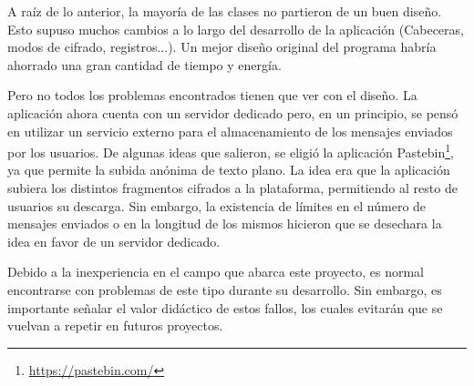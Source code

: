 A raíz de lo anterior, la mayoría de las clases no partieron de un buen diseño. Esto supuso muchos cambios a lo largo del desarrollo de la aplicación (Cabeceras, modos de cifrado, registros...). Un mejor diseño original del programa habría ahorrado una gran cantidad de tiempo y energía.

Pero no todos los problemas encontrados tienen que ver con el diseño. La aplicación ahora cuenta con un servidor dedicado pero, en un principio, se pensó en utilizar un servicio externo para el almacenamiento de los mensajes enviados por los usuarios. De algunas ideas que salieron, se eligió la aplicación Pastebin\footnote{\url{https://pastebin.com/}}, ya que permite la subida anónima de texto plano. La idea era que la aplicación subiera los distintos fragmentos cifrados a la plataforma, permitiendo al resto de usuarios su descarga. Sin embargo, la existencia de límites en el número de mensajes enviados o en la longitud de los mismos hicieron que se desechara la idea en favor de un servidor dedicado.

Debido a la inexperiencia en el campo que abarca este proyecto, es normal encontrarse con problemas de este tipo durante su desarrollo. Sin embargo, es importante señalar el valor didáctico de estos fallos, los cuales evitarán que se vuelvan a repetir en futuros proyectos.
